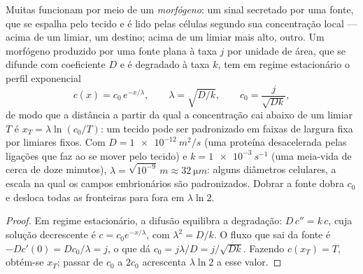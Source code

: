 \begin{theorem}\label{thm:b2:vertebrate-development:gradient}
Muitas  funcionam por meio de um \emph{morfógeno}: um sinal
secretado por uma fonte, que se espalha pelo tecido e é lido pelas
células segundo sua concentração local --- acima de um limiar, um
destino; acima de um limiar mais alto, outro. Um morfógeno produzido
por uma fonte plana à taxa $j$ por unidade de área, que se difunde com
coeficiente $D$ e é degradado à taxa $k$, tem em regime estacionário o
perfil exponencial
\[
c(x) = c_0\,e^{-x/\lambda}, \qquad \lambda = \sqrt{D/k}, \qquad c_0 = \frac{j}{\sqrt{Dk}},
\]
de modo que a distância a partir da qual a concentração cai abaixo de
um limiar $T$ é $x_T = \lambda\ln(c_0/T)$: um tecido pode ser
padronizado em faixas de largura fixa por limiares fixos. Com $D =
\qty{1e-12}{m^2/s}$ (uma proteína desacelerada pelas ligações que faz
ao se mover pelo tecido) e $k = \qty{1e-3}{s^{-1}}$ (uma meia-vida de
cerca de doze minutos), $\lambda = \sqrt{10^{-9}}\,\unit{m} \approx
\qty{32}{\micro m}$: alguns diâmetros celulares,
a escala na qual os campos embrionários são padronizados. Dobrar a
fonte dobra $c_0$ e desloca todas as fronteiras para fora em $\lambda
\ln 2$.
\end{theorem}
\begin{proof}
Em regime estacionário, a difusão equilibra a degradação:
$D\,c'' = k\,c$, cuja solução decrescente é $c = c_0 e^{-x/\lambda}$,
com $\lambda^2 =
D/k$. O fluxo que sai da fonte é $-Dc'(0) = Dc_0/\lambda = j$, o que
dá $c_0 = j\lambda/D = j/\sqrt{Dk}$. Fazendo $c(x_T) = T$, obtém-se
$x_T$; passar de $c_0$ a $2c_0$ acrescenta $\lambda\ln 2$ a esse valor.
\end{proof}

